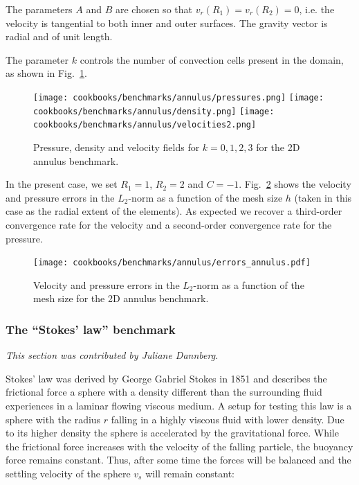 \documentclass{article}
\begin{document}
The parameters $A$ and $B$ are chosen so that $v_r(R_1)=v_r(R_2)=0$, i.e.
the velocity is tangential to both inner and outer surfaces.
The gravity vector is radial and of unit length.

The parameter $k$ controls the number of convection cells present in the domain,
as shown in Fig.~\ref{fig:annulus-vp}.

\begin{figure}
\centering
\texttt{[image: cookbooks/benchmarks/annulus/pressures.png]}
\texttt{[image: cookbooks/benchmarks/annulus/density.png]}
\texttt{[image: cookbooks/benchmarks/annulus/velocities2.png]}
\caption{Pressure, density and velocity fields for $k=0,1,2,3$ for the 2D annulus benchmark.}
\label{fig:annulus-vp}
\end{figure}

In the present case, we set $R_1=1$, $R_2=2$ and $C=-1$. Fig.~\ref{fig:annulus-errors} shows the
velocity and pressure errors in the $L_2$-norm as a function of the mesh size $h$ (taken in this case
as the radial extent of the elements). As expected we recover a third-order convergence rate for the velocity
and a second-order convergence rate for the pressure.

\begin{figure}
\centering
\texttt{[image: cookbooks/benchmarks/annulus/errors\_annulus.pdf]}
\caption{Velocity and pressure errors in the $L_2$-norm as a function of the mesh size for the 2D annulus benchmark.}
\label{fig:annulus-errors}
\end{figure}

\subsubsection{The ``Stokes' law'' benchmark}
\label{sec:benchmark-stokes_law}

\textit{This section was contributed by Juliane Dannberg.}

Stokes' law was derived by George Gabriel Stokes in 1851 and describes the frictional force
a sphere with a density different than the surrounding fluid experiences in a
laminar flowing viscous medium.
A setup for testing this law is a sphere with the radius $r$ falling in a highly
viscous fluid with lower density. Due to its higher density the sphere is
accelerated by the gravitational force. While
the frictional force increases with the velocity of the falling particle,
the buoyancy force remains constant. Thus, after some time the forces will
be balanced and the settling velocity of the sphere $v_s$ will remain constant:
\end{document}
